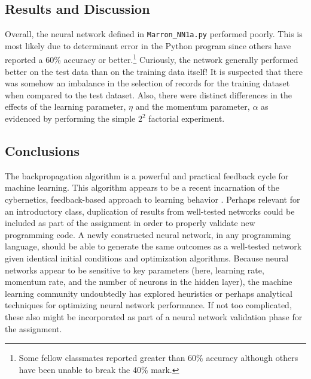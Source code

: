 \documentclass[12pt]{article}
\begin{document}
\subsection{Results and Discussion}
Overall, the neural network defined in \verb|Marron_NN1a.py| performed poorly. This is most likely due to determinant error in the Python program since others have reported a 60\% accuracy or better.\footnote{Some fellow classmates reported greater than 60\% accuracy although others have been unable to break the 40\% mark.} Curiously, the network generally performed better on the test data than on the training data itself! It is suspected that there was somehow an imbalance in the selection of records for the training dataset when compared to the test dataset. Also, there were distinct differences in the effects of the learning parameter, $\eta $ and the momentum parameter, $\alpha $ as evidenced by performing the simple $2^{2}$ factorial experiment.

\subsection{Conclusions}
The backpropagation algorithm is a powerful and practical feedback cycle for machine learning. This algorithm appears to be a recent incarnation of the cybernetics, feedback-based approach to learning behavior \cite{ashby_introduction_1955, mackay_information_2003}. Perhaps relevant for an introductory class, duplication of results from well-tested networks could be included as part of the assignment in order to properly validate new programming code. A newly constructed neural network, in any programming language, should be able to generate the same outcomes as a well-tested network given identical initial conditions and optimization algorithms. Because neural networks appear to be sensitive to key parameters (here, learning rate, momentum rate, and the number of neurons in the hidden layer), the machine learning community undoubtedly has explored heuristics or perhaps analytical techniques for optimizing neural network performance. If not too complicated, these also might be incorporated as part of a neural network validation phase for the assignment.

\renewcommand{\refname}{\normalfont\selectfont\small \textbf{References}} 


\end{document}

